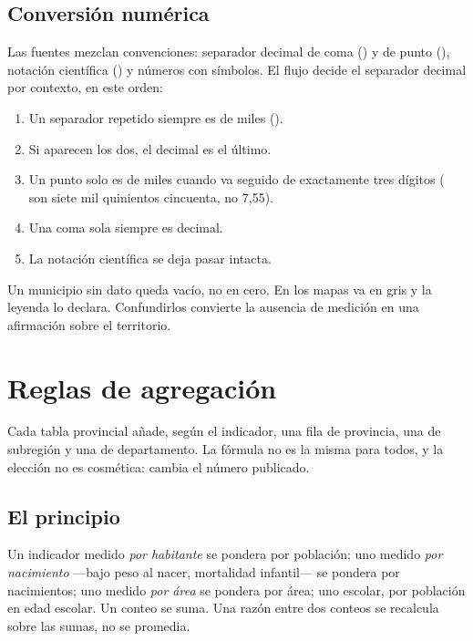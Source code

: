 \documentclass[11pt,a4paper]{article}
\begin{document}
\subsection{Conversión numérica}

Las fuentes mezclan convenciones: separador decimal de coma () y de
punto (), notación científica () y números con símbolos.
El flujo decide el separador decimal por contexto, en este orden:

\begin{enumerate}[leftmargin=*, itemsep=1pt]
  \item Un separador repetido siempre es de miles ().
  \item Si aparecen los dos, el decimal es el último.
  \item Un punto solo es de miles cuando va seguido de exactamente tres dígitos
    ( son siete mil quinientos cincuenta, no 7,55).
  \item Una coma sola siempre es decimal.
  \item La notación científica se deja pasar intacta.
\end{enumerate}

\begin{regla}[title={Regla 5 — cero y vacío no son lo mismo}]
Un municipio sin dato queda vacío, no en cero. En los mapas va en gris y la
leyenda lo declara. Confundirlos convierte la ausencia de medición en una
afirmación sobre el territorio.
\end{regla}

\section{Reglas de agregación}

Cada tabla provincial añade, según el indicador, una fila de provincia, una de
subregión y una de departamento. La fórmula no es la misma para todos, y la
elección no es cosmética: cambia el número publicado.

\subsection{El principio}

\begin{regla}[title={Regla 6 — el denominador del indicador manda}]
Un indicador medido \emph{por habitante} se pondera por población; uno medido
\emph{por nacimiento} —bajo peso al nacer, mortalidad infantil— se pondera por
nacimientos; uno medido \emph{por área} se pondera por área; uno escolar, por
población en edad escolar. Un conteo se suma. Una razón entre dos conteos se
recalcula sobre las sumas, no se promedia.
\end{regla}
\end{document}
